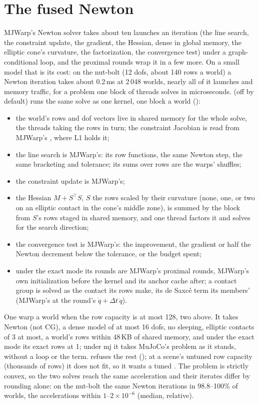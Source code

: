\section{The fused Newton}\label{sec:fusednewton}

MJWarp's Newton solver takes about ten launches an iteration (the line search, the constraint update, the gradient, the Hessian, dense in global memory, the elliptic cone's curvature, the factorization, the convergence test) under a graph-conditional loop, and the proximal rounds wrap it in a few more. On a small model that is its cost: on the nut-bolt (12 dofs, about 140 rows a world) a Newton iteration takes about 0.2\,ms at 2\,048 worlds, nearly all of it launches and memory traffic, for a problem one block of threads solves in microseconds.  (off by default) runs the same solve as one kernel, one block a world ():
\begin{itemize}
\item the world's rows and dof vectors live in shared memory for the whole solve, the threads taking the rows in turn; the constraint Jacobian is read from MJWarp's , where L1 holds it;
\item the line search is MJWarp's: its row functions, the same Newton step, the same bracketing and tolerance; its sums over rows are the warps' shuffles;
\item the constraint update is MJWarp's;
\item the Hessian $M + S^\top S$, $S$ the rows scaled by their curvature (none, one, or two on an elliptic contact in the cone's middle zone), is summed by the block from $S$'s rows staged in shared memory, and one thread factors it and solves for the search direction;
\item the convergence test is MJWarp's: the improvement, the gradient or half the Newton decrement below the tolerance, or the budget spent;
\item under the exact mode its rounds are MJWarp's proximal rounds, MJWarp's own initialization before the kernel and its anchor cache after; a contact group is solved as the contact its rows make, its de Saxc\'e term its members' (MJWarp's  at the round's $\dot q + \Delta t\,\ddot q$).
\end{itemize}

One warp a world when the row capacity  is at most 128, two above. It takes Newton (not CG), a dense model of at most 16 dofs, no sleeping, elliptic contacts of  3 at most, a world's rows within 48\,KB of shared memory, and under the exact mode its exact rows at  1; under mj it takes MuJoCo's problem as it stands, without a loop or the term.  refuses the rest (); at a scene's untuned row capacity (thousands of rows) it does not fit, so it wants a tuned . The problem is strictly convex, so the two solves reach the same acceleration and their iterates differ by rounding alone: on the nut-bolt the same Newton iterations in 98.8--100\% of worlds, the accelerations within $1$--$2\times10^{-6}$ (median, relative).


